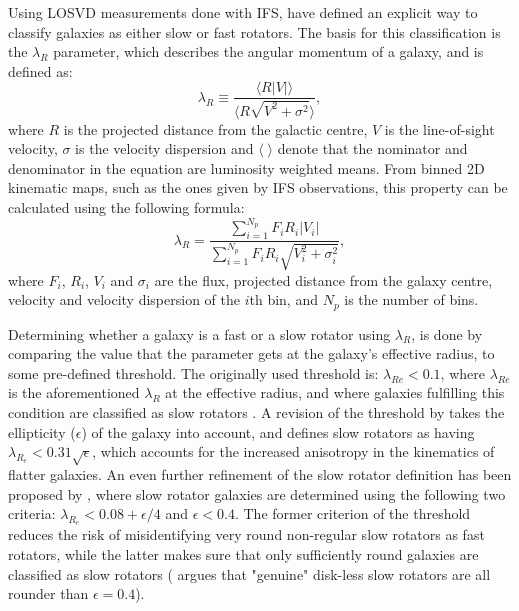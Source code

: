 \documentclass[english, oneside]{HYgradu}
\begin{document}
Using LOSVD measurements done with IFS, \cite{Emsellem2007} have defined an explicit way to classify galaxies as either slow or fast rotators. The basis for this classification is the $\lambda_R$ parameter, which describes the angular momentum of a galaxy, and is defined as:  
\begin{equation}
\lambda_R \equiv \frac{\langle R |V| \rangle}{\langle R \sqrt{V^2 + \sigma^2} \rangle}, \label{eq:general_lambdar}
\end{equation}
where $R$ is the projected distance from the galactic centre, $V$ is the line-of-sight velocity, $\sigma$ is the velocity dispersion and $\langle \; \rangle$ denote that the nominator and denominator in the equation are luminosity weighted means. From binned 2D kinematic maps, such as the ones given by IFS observations, this property can be calculated using the following formula:
\begin{equation}
\lambda_R = \frac{\sum^{N_p}_{i=1} F_i R_i |V_i|}{\sum^{N_p}_{i=1} F_i R_i \sqrt{V_i^2 + \sigma^2_i}}, \label{eq:binned_lambdar}
\end{equation}
where $F_i$, $R_i$, $V_i$ and $\sigma_i$ are the flux, projected distance from the galaxy centre, velocity and velocity dispersion of the $i$th bin, and $N_p$ is the number of bins.

Determining whether a galaxy is a fast or a slow rotator using $\lambda_R$, is done by comparing the value that the parameter gets at the galaxy's effective radius, to some pre-defined threshold. The originally used threshold is: $\lambda_{Re} < 0.1$, where $\lambda_{Re}$ is the aforementioned $\lambda_R$ at the effective radius, and where galaxies fulfilling this condition are classified as slow rotators \citep{Emsellem2007}. A revision of the threshold by \cite{Emsellem2011} takes the ellipticity ($\epsilon$) of the galaxy into account, and defines slow rotators as having $\lambda_{R_e} < 0.31 \sqrt{\epsilon}$, which accounts for the increased anisotropy in the kinematics of flatter galaxies. An even further refinement of the slow rotator definition has been proposed by \cite{Cappellari2016}, where slow rotator galaxies are determined using the following two criteria: $\lambda_{R_e} < 0.08 + \epsilon/4$ and $\epsilon < 0.4$. The former criterion of the threshold reduces the risk of misidentifying very round non-regular slow rotators as fast rotators, while the latter makes sure that only sufficiently round galaxies are classified as slow rotators (\citealt{Cappellari2016} argues that "genuine" disk-less slow rotators are all rounder than $\epsilon = 0.4$).
\end{document}
